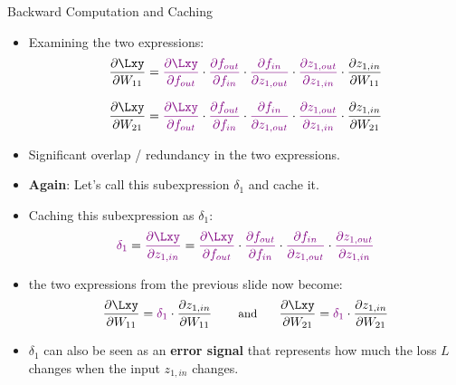 \begin{vbframe}{Backward Computation and Caching}
\begin{itemize}
\item Examining the two expressions:
$$\frac{\partial \Lxy}{\partial W_{11}} =
\textcolor{violet}{\frac{\partial \Lxy}{\partial f_{out}}} \cdot  \textcolor{violet}{\frac{\partial f_{out}}{\partial f_{in}}} \cdot  \textcolor{violet}{\frac{\partial f_{in}}{\partial z_{1,out}}} \cdot  \textcolor{violet}{\frac{\partial z_{1,out}}{\partial z_{1,in}}} \cdot  \textcolor{black}{\frac{\partial z_{1,in}}{\partial W_{11}}}$$

$$\frac{\partial \Lxy}{\partial W_{21}} =
\textcolor{violet}{\frac{\partial \Lxy}{\partial f_{out}}} \cdot  \textcolor{violet}{\frac{\partial f_{out}}{\partial f_{in}}} \cdot  \textcolor{violet}{\frac{\partial f_{in}}{\partial z_{1,out}}} \cdot  \textcolor{violet}{\frac{\partial z_{1,out}}{\partial z_{1,in}}} \cdot  \textcolor{black}{\frac{\partial z_{1,in}}{\partial W_{21}}}$$

\item Significant overlap / redundancy in the two expressions.
\item \textbf{Again}: Let's call this subexpression $\delta_1$ and cache it.
\end{itemize}
\framebreak

\begin{itemize}
\item Caching this subexpression as $\delta_1$:
{\small $$\textcolor{violet}{\delta_1}  = \textcolor{violet}{\frac{\partial \Lxy}{\partial z_{1,in}}} =
\textcolor{violet}{\frac{\partial \Lxy}{\partial f_{out}}} \cdot  \textcolor{violet}{\frac{\partial f_{out}}{\partial f_{in}}} \cdot  \textcolor{violet}{\frac{\partial f_{in}}{\partial z_{1,out}}} \cdot  \textcolor{violet}{\frac{\partial z_{1,out}}{\partial z_{1,in}}}$$}
\item the two expressions from the previous slide now become:
{\small $$\frac{\partial \Lxy}{\partial W_{11}} = \textcolor{violet}{\delta_1} \cdot \frac{\partial z_{1,in}}{\partial W_{11}} \mbox{ \hspace{0.5cm} \small{and} \hspace{0.5cm}} \frac{\partial \Lxy}{\partial W_{21}} = \textcolor{violet}{\delta_1} \cdot \frac{\partial z_{1,in}}{\partial W_{21}} $$}
\item $\delta_1$ can also be seen as an \textbf{error signal} that represents how much the loss $L$ changes when the input $z_{1,in}$ changes.
\end{itemize}
\end{vbframe}

